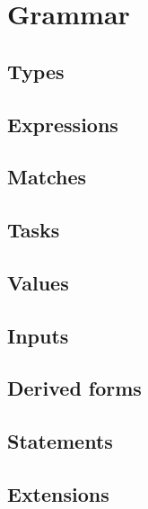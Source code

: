 
\section{Grammar}

\subsection{Types}



\subsection{Expressions}



\subsection{Matches}



\subsection{Tasks}



\subsection{Values}



\subsection{Inputs}



\subsection{Derived forms}



\subsection{Statements}



\subsection{Extensions}

